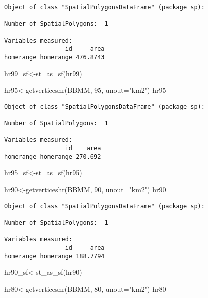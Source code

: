 \documentclass[
  letterpaper,
]{book}
\newenvironment{Shaded}{\begin{snugshade}}{\end{snugshade}}
\newcommand{\AttributeTok}[1]{\textcolor[rgb]{0.40,0.45,0.13}{#1}}
\newcommand{\DecValTok}[1]{\textcolor[rgb]{0.68,0.00,0.00}{#1}}
\newcommand{\FunctionTok}[1]{\textcolor[rgb]{0.28,0.35,0.67}{#1}}
\newcommand{\NormalTok}[1]{\textcolor[rgb]{0.00,0.23,0.31}{#1}}
\newcommand{\OtherTok}[1]{\textcolor[rgb]{0.00,0.23,0.31}{#1}}
\newcommand{\StringTok}[1]{\textcolor[rgb]{0.13,0.47,0.30}{#1}}
\begin{document}
\begin{verbatim}
Object of class "SpatialPolygonsDataFrame" (package sp):

Number of SpatialPolygons:  1

Variables measured:
                 id     area
homerange homerange 476.8743
\end{verbatim}

\begin{Shaded}
\begin{Highlighting}[]
\NormalTok{hr99\_sf}\OtherTok{\textless{}{-}}\FunctionTok{st\_as\_sf}\NormalTok{(hr99)}

\NormalTok{hr95}\OtherTok{\textless{}{-}}\FunctionTok{getverticeshr}\NormalTok{(BBMM, }\DecValTok{95}\NormalTok{, }\AttributeTok{unout=}\StringTok{"km2"}\NormalTok{)}
\NormalTok{hr95}
\end{Highlighting}
\end{Shaded}

\begin{verbatim}
Object of class "SpatialPolygonsDataFrame" (package sp):

Number of SpatialPolygons:  1

Variables measured:
                 id    area
homerange homerange 270.692
\end{verbatim}

\begin{Shaded}
\begin{Highlighting}[]
\NormalTok{hr95\_sf}\OtherTok{\textless{}{-}}\FunctionTok{st\_as\_sf}\NormalTok{(hr95)}

\NormalTok{hr90}\OtherTok{\textless{}{-}}\FunctionTok{getverticeshr}\NormalTok{(BBMM, }\DecValTok{90}\NormalTok{, }\AttributeTok{unout=}\StringTok{"km2"}\NormalTok{)}
\NormalTok{hr90}
\end{Highlighting}
\end{Shaded}

\begin{verbatim}
Object of class "SpatialPolygonsDataFrame" (package sp):

Number of SpatialPolygons:  1

Variables measured:
                 id     area
homerange homerange 188.7794
\end{verbatim}

\begin{Shaded}
\begin{Highlighting}[]
\NormalTok{hr90\_sf}\OtherTok{\textless{}{-}}\FunctionTok{st\_as\_sf}\NormalTok{(hr90)}

\NormalTok{hr80}\OtherTok{\textless{}{-}}\FunctionTok{getverticeshr}\NormalTok{(BBMM, }\DecValTok{80}\NormalTok{, }\AttributeTok{unout=}\StringTok{"km2"}\NormalTok{)}
\NormalTok{hr80}
\end{Highlighting}
\end{Shaded}
\end{document}
